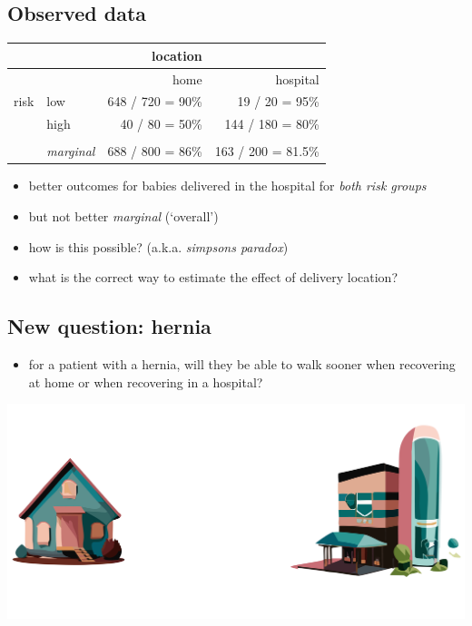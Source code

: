 \documentclass[
  letterpaper,
  DIV=11,
  numbers=noendperiod]{scrartcl}
\providecommand{\tightlist}{%
  \setlength{\itemsep}{0pt}\setlength{\parskip}{0pt}}\usepackage{longtable,booktabs,array}
\begin{document}
\subsection{Observed data}\label{observed-data-1}

\begin{longtable}[]{@{}llrr@{}}
\toprule\noalign{}
& & location & \\
\midrule\noalign{}
\endhead
\bottomrule\noalign{}
\endlastfoot
& & home & hospital \\
risk & low & 648 / 720 = 90\% & 19 / 20 = 95\% \\
& high & 40 / 80 = 50\% & 144 / 180 = 80\% \\
& & & \\
& \emph{marginal} & 688 / 800 = 86\% & 163 / 200 = 81.5\% \\
\end{longtable}

\begin{itemize}
\tightlist
\item
  better outcomes for babies delivered in the hospital for \emph{both
  risk groups}
\item
  but not better \emph{marginal} (`overall')
\item
  how is this possible? (a.k.a. \emph{simpsons paradox})
\item
  what is the correct way to estimate the effect of delivery location?
\end{itemize}

\subsection{New question: hernia}\label{new-question-hernia}

\begin{itemize}
\tightlist
\item
  for a patient with a hernia, will they be able to walk sooner when
  recovering at home or when recovering in a hospital?
\end{itemize}

\includegraphics{figs/delivery-locations.png}
\end{document}
